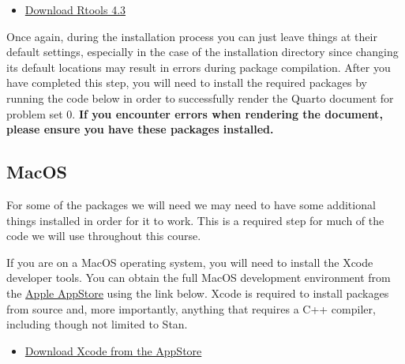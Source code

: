 \documentclass[
  letterpaper,
  DIV=11,
  numbers=noendperiod,
  oneside]{scrreprt}
\providecommand{\tightlist}{%
  \setlength{\itemsep}{0pt}\setlength{\parskip}{0pt}}\usepackage{longtable,booktabs,array}
\begin{document}
\begin{itemize}
\tightlist
\item
  \href{https://cran.r-project.org/bin/windows/Rtools/rtools43/files/rtools43-5550-5548.exe}{Download
  Rtools 4.3}
\end{itemize}

Once again, during the installation process you can just leave things at
their default settings, especially in the case of the installation
directory since changing its default locations may result in errors
during package compilation. After you have completed this step, you will
need to install the required packages by running the code below in order
to successfully render the Quarto document for problem set 0. \textbf{If
you encounter errors when rendering the document, please ensure you have
these packages installed.}

\subsection{MacOS}

\begin{tcolorbox}[enhanced jigsaw, breakable, opacitybacktitle=0.6, colframe=quarto-callout-warning-color-frame, bottomrule=.15mm, opacityback=0, toprule=.15mm, coltitle=black, toptitle=1mm, colback=white, titlerule=0mm, bottomtitle=1mm, colbacktitle=quarto-callout-warning-color!10!white, title=\textcolor{quarto-callout-warning-color}{\faExclamationTriangle}\hspace{0.5em}{Required Step}, rightrule=.15mm, arc=.35mm, leftrule=.75mm, left=2mm]

For some of the packages we will need we may need to have some
additional things installed in order for it to work. This is a required
step for much of the code we will use throughout this course.

\end{tcolorbox}

If you are on a MacOS operating system, you will need to install the
Xcode developer tools. You can obtain the full MacOS development
environment from the
\href{https://developer.apple.com/xcode/resources/}{Apple AppStore}
using the link below. Xcode is required to install packages from source
and, more importantly, anything that requires a C++ compiler, including
though not limited to Stan.

\begin{itemize}
\tightlist
\item
  \href{https://apps.apple.com/us/app/xcode/id497799835?mt=12}{Download
  Xcode from the AppStore}
\end{itemize}
\end{document}
